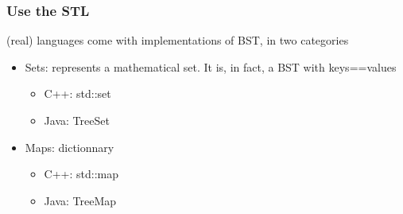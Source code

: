 \begin{frame}
	\frametitle{Use the STL}
	(real) languages come with implementations of BST, in two categories
	\begin{itemize}
		\item Sets: represents a mathematical set. It is, in fact, a BST with keys==values
			\begin{itemize}
				\item C++: std::set
				\item Java: TreeSet
			\end{itemize}
		\item Maps: dictionnary
		\begin{itemize}
			\item C++: std::map
			\item Java: TreeMap
		\end{itemize}
	\end{itemize}
\end{frame}